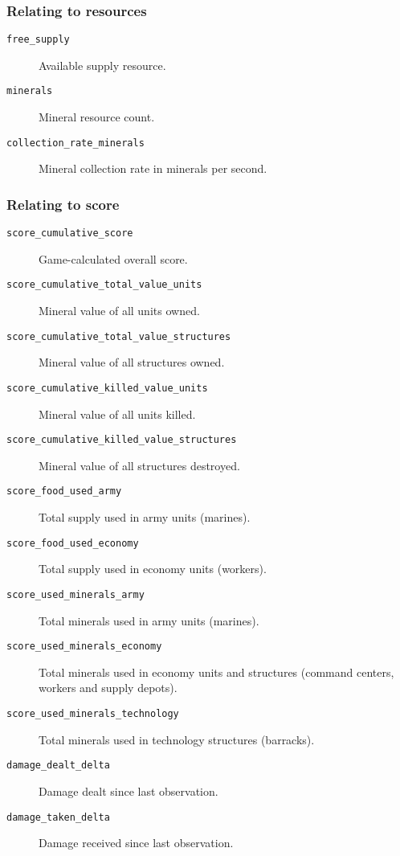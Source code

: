 \subsubsection*{Relating to resources}
\begin{description}
    \item[\texttt{free\_supply}] Available supply resource.
    \item[\texttt{minerals}] Mineral resource count.
    \item[\texttt{collection\_rate\_minerals}] Mineral collection rate in minerals per second.
\end{description}

\subsubsection*{Relating to score}
\begin{description}
    \item[\texttt{score\_cumulative\_score}] Game-calculated overall score.
    \item[\texttt{score\_cumulative\_total\_value\_units}] Mineral value of all units owned.
    \item[\texttt{score\_cumulative\_total\_value\_structures}] Mineral value of all structures owned.
    \item[\texttt{score\_cumulative\_killed\_value\_units}] Mineral value of all units killed.
    \item[\texttt{score\_cumulative\_killed\_value\_structures}] Mineral value of all structures destroyed.
    \item[\texttt{score\_food\_used\_army}] Total supply used in army units (marines).
    \item[\texttt{score\_food\_used\_economy}] Total supply used in economy units (workers).
    \item[\texttt{score\_used\_minerals\_army}] Total minerals used in army units (marines).
    \item[\texttt{score\_used\_minerals\_economy}] Total minerals used in economy units and structures (command centers, workers and supply depots).
    \item[\texttt{score\_used\_minerals\_technology}] Total minerals used in technology structures (barracks).
    \item[\texttt{damage\_dealt\_delta}] Damage dealt since last observation.
    \item[\texttt{damage\_taken\_delta}] Damage received since last observation.
\end{description}

